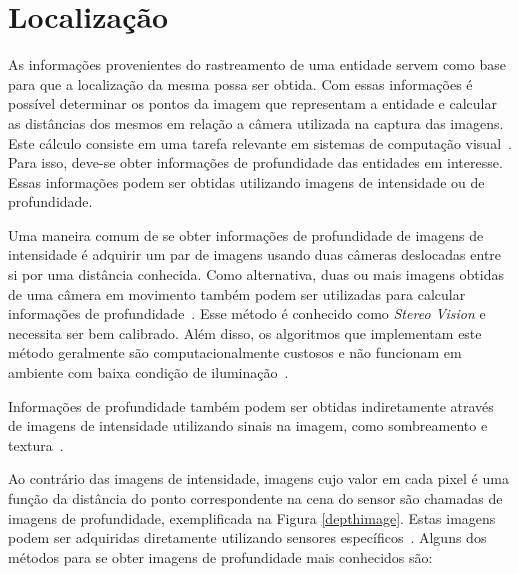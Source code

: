 \section{Localização}
\label{sec:luz-estruturada}

	As informações provenientes do rastreamento de uma entidade servem como base para que a localização da mesma possa ser obtida. Com essas informações é possível determinar os pontos da imagem que representam a entidade e calcular as distâncias dos mesmos em relação a câmera utilizada na captura das imagens. Este cálculo consiste em uma tarefa relevante em sistemas de computação visual~\cite{jain}. Para isso,
	deve-se obter informações de profundidade das entidades em interesse. Essas
	informações podem ser obtidas utilizando imagens de intensidade ou de
	profundidade.
	
	Uma maneira comum de se obter informações de profundidade de imagens de
	intensidade é adquirir um par de imagens usando duas câmeras deslocadas entre si
	por uma distância conhecida. Como alternativa, duas ou mais imagens obtidas de
	uma câmera em movimento também podem ser utilizadas para calcular informações de
	profundidade~\cite{jain}. Esse método é conhecido como \textit{Stereo Vision} e
	necessita ser bem calibrado.  Além disso, os algoritmos que implementam este método
	geralmente são computacionalmente custosos e não funcionam em ambiente com baixa
	condição de iluminação~\cite{fall-detection}.
	
	Informações de profundidade também podem ser obtidas indiretamente através de
	imagens de intensidade utilizando sinais na imagem, como sombreamento e
	textura~\cite{jain}.
	
	Ao contrário das imagens de intensidade, imagens cujo valor em cada pixel é uma
	função da distância do ponto correspondente na cena do sensor são chamadas de
	imagens de profundidade, exemplificada na Figura \ref{depthimage}. Estas imagens
	podem ser adquiridas diretamente utilizando sensores específicos~\cite{jain}.
	Alguns dos métodos para se obter imagens de profundidade mais conhecidos são:

